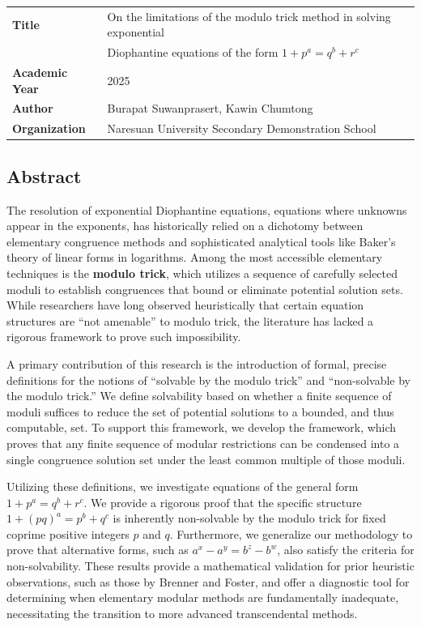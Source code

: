 \documentclass[12pt]{article}
\begin{document}
\begin{tabular}{ l l }
\textbf{Title} & On the limitations of the modulo trick method in solving exponential \\
& Diophantine equations of the form $1+p^a=q^b+r^c$ \\ 
\textbf{Academic Year} & 2025 \\
\textbf{Author} & Burapat Suwanprasert, Kawin Chumtong \\
\textbf{Organization} & Naresuan University Secondary Demonstration School
\end{tabular}
\begin{center}
\section*{Abstract}
\end{center}
The resolution of exponential Diophantine equations, equations where unknowns appear in the exponents, has historically relied on a dichotomy between elementary congruence methods and sophisticated analytical tools like Baker’s theory of linear forms in logarithms. Among the most accessible elementary techniques is the \textbf{modulo trick}, which utilizes a sequence of carefully selected moduli to establish congruences that bound or eliminate potential solution sets. While researchers have long observed heuristically that certain equation structures are ``not amenable'' to modulo trick, the literature has lacked a rigorous framework to prove such impossibility. 

A primary contribution of this research is the introduction of formal, precise definitions for the notions of ``solvable by the modulo trick'' and ``non-solvable by the modulo trick.'' We define solvability based on whether a finite sequence of moduli suffices to reduce the set of potential solutions to a bounded, and thus computable, set. To support this framework, we develop the framework, which proves that any finite sequence of modular restrictions can be condensed into a single congruence solution set under the least common multiple of those moduli.

Utilizing these definitions, we investigate equations of the general form $1 + p^a = q^b + r^c$. We provide a rigorous proof that the specific structure $1 + (pq)^a = p^b + q^c$ is inherently non-solvable by the modulo trick for fixed coprime positive integers $p$ and $q$. Furthermore, we generalize our methodology to prove that alternative forms, such as $a^x - a^y = b^z - b^w$, also satisfy the criteria for non-solvability. These results provide a mathematical validation for prior heuristic observations, such as those by \cite{eDe} Brenner and Foster, and offer a diagnostic tool for determining when elementary modular methods are fundamentally inadequate, necessitating the transition to more advanced transcendental methods.
\end{document}
